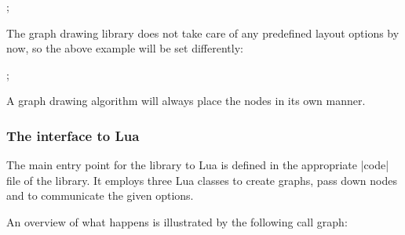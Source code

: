 \begin{codeexample}[]
\tikzpicture
  ;
\endtikzpicture
\end{codeexample}

The graph drawing library does not take care of any predefined layout options by now, so the above example will be set differently:

\begin{codeexample}[]
\tikzpicture[graph drawing={few intersections}, scale=2]
  ;
\endtikzpicture
\end{codeexample}

A graph drawing algorithm will always place the nodes in its own manner. 


\subsubsection{The interface to Lua}
The main entry point for the library to Lua is defined in the
appropriate |code| file of the library. It employs three Lua classes
to create graphs, pass down nodes and to communicate the given
options.

An overview of what happens is illustrated by the following call graph:

